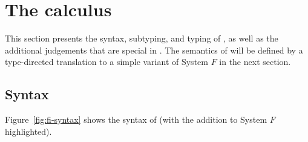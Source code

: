 \section{The \name calculus} \label{sec:fi}

This section presents the syntax, subtyping, and typing of \name, as well as the
additional judgements that are special in \name. The semantics of \name will be
defined by a type-directed translation to a simple variant of System $F$ in the
next section.

\subsection{Syntax}

Figure~\ref{fig:fi-syntax} shows the syntax of \name (with the addition to
System $F$ highlighted).


